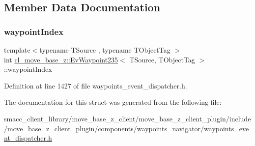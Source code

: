 \subsection{Member Data Documentation}
\mbox{\label{structcl__move__base__z_1_1EvWaypoint235_af88a99e13031db650841c5a5a51501c0}} 
\subsubsection{\texorpdfstring{waypoint\+Index}{waypointIndex}}
{\footnotesize\ttfamily template$<$typename T\+Source , typename T\+Object\+Tag $>$ \\
int \hyperlink{structcl__move__base__z_1_1EvWaypoint235}{cl\+\_\+move\+\_\+base\+\_\+z\+::\+Ev\+Waypoint235}$<$ T\+Source, T\+Object\+Tag $>$\+::waypoint\+Index}



Definition at line 1427 of file waypoints\+\_\+event\+\_\+dispatcher.\+h.



The documentation for this struct was generated from the following file\+:\begin{DoxyCompactItemize}
\item 
smacc\+\_\+client\+\_\+library/move\+\_\+base\+\_\+z\+\_\+client/move\+\_\+base\+\_\+z\+\_\+client\+\_\+plugin/include/move\+\_\+base\+\_\+z\+\_\+client\+\_\+plugin/components/waypoints\+\_\+navigator/\hyperlink{waypoints__event__dispatcher_8h}{waypoints\+\_\+event\+\_\+dispatcher.\+h}\end{DoxyCompactItemize}
